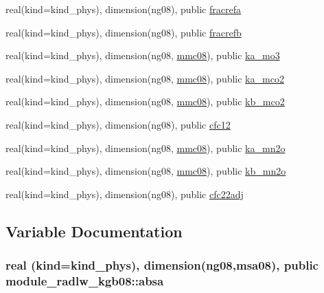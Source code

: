 \begin{DoxyCompactItemize}
real(kind=kind\+\_\+phys), dimension(ng08), public \hyperlink{namespacemodule__radlw__kgb08_ad1a59ffb362cd72537df9c1916c07621}{fracrefa}
\item 
real(kind=kind\+\_\+phys), dimension(ng08), public \hyperlink{namespacemodule__radlw__kgb08_a0ae7e4c01034a2b95c03b041537b962e}{fracrefb}
\item 
real(kind=kind\+\_\+phys), dimension(ng08, \hyperlink{namespacemodule__radlw__kgb08_a9e3bfc1880221c18fa07817eb62bcc47}{mmc08}), public \hyperlink{namespacemodule__radlw__kgb08_a7dec65e880c278f44419c1ae01490eae}{ka\+\_\+mo3}
\item 
real(kind=kind\+\_\+phys), dimension(ng08, \hyperlink{namespacemodule__radlw__kgb08_a9e3bfc1880221c18fa07817eb62bcc47}{mmc08}), public \hyperlink{namespacemodule__radlw__kgb08_a0fcd13503b3253ec6aab0aa52056f634}{ka\+\_\+mco2}
\item 
real(kind=kind\+\_\+phys), dimension(ng08, \hyperlink{namespacemodule__radlw__kgb08_a9e3bfc1880221c18fa07817eb62bcc47}{mmc08}), public \hyperlink{namespacemodule__radlw__kgb08_a9a85770aee1b88b9323d9466c1772ec4}{kb\+\_\+mco2}
\item 
real(kind=kind\+\_\+phys), dimension(ng08), public \hyperlink{namespacemodule__radlw__kgb08_a010239f14788bc1ed9953133e30a62fd}{cfc12}
\item 
real(kind=kind\+\_\+phys), dimension(ng08, \hyperlink{namespacemodule__radlw__kgb08_a9e3bfc1880221c18fa07817eb62bcc47}{mmc08}), public \hyperlink{namespacemodule__radlw__kgb08_a61949dc331e9a58d4f2a31b625481795}{ka\+\_\+mn2o}
\item 
real(kind=kind\+\_\+phys), dimension(ng08, \hyperlink{namespacemodule__radlw__kgb08_a9e3bfc1880221c18fa07817eb62bcc47}{mmc08}), public \hyperlink{namespacemodule__radlw__kgb08_a9a8e2f789421acc307e37b03478efb4b}{kb\+\_\+mn2o}
\item 
real(kind=kind\+\_\+phys), dimension(ng08), public \hyperlink{namespacemodule__radlw__kgb08_a38a3ce7d8f3db6b732511cf78ef735db}{cfc22adj}
\end{DoxyCompactItemize}


\subsection{Variable Documentation}
\subsubsection[{\texorpdfstring{absa}{absa}}]{\setlength{\rightskip}{0pt plus 5cm}real (kind=kind\+\_\+phys), dimension(ng08,{\bf msa08}), public module\+\_\+radlw\+\_\+kgb08\+::absa}\hypertarget{namespacemodule__radlw__kgb08_aba1018958264bbc6fbf7f190fea91fa5}{}\label{namespacemodule__radlw__kgb08_aba1018958264bbc6fbf7f190fea91fa5}


